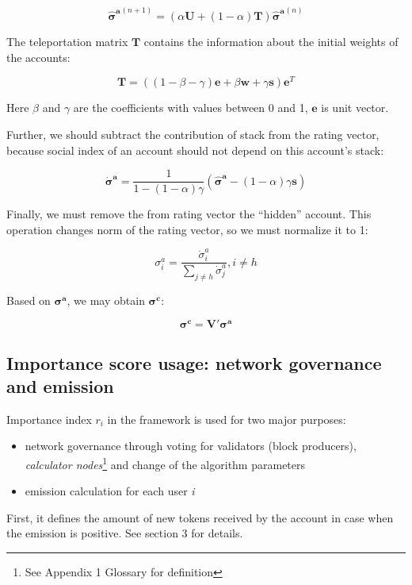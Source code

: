 \documentclass[a4paper,12pt]{article}
\begin{document}
	$$
	\boldsymbol{\hat{\sigma}^a}^{(n+1)} = (\alpha \boldsymbol{U} + (1 - \alpha) \boldsymbol{T})\boldsymbol{ \hat{\sigma}^a}^{(n)}
	$$
	
	The teleportation matrix $\boldsymbol{T}$ contains the information about the initial weights of the accounts:
	
	$$
	\boldsymbol{T} = ((1 - \beta - \gamma) \boldsymbol{e} + \beta \boldsymbol{w} + \gamma \boldsymbol{s}) \boldsymbol{e}^T
	$$
	
	Here $\beta$ and $\gamma$ are the coefficients with values between 0 and 1, $\boldsymbol{e}$ is unit vector.
	
	Further, we should subtract the contribution of stack from the rating vector, because social index of an account should not depend on this account's stack:
	
	$$
	\boldsymbol{\dot{\sigma}^a} = \frac{1}{1 - (1-\alpha) \gamma}(\boldsymbol{\hat{\sigma}^a} - (1 - \alpha) \gamma \boldsymbol{s})
	$$
	
	Finally, we must remove the from rating vector the ``hidden'' account. This operation changes norm of the rating vector, so we must normalize it to 1:
	
	$$
	\sigma^a_i = \frac{\dot{\sigma}^a_i}{\sum_{j \ne h} \dot{\sigma}^a_j}, i \ne h
	$$
	
	
	Based on $\boldsymbol{\sigma^a}$, we may obtain $\boldsymbol{\sigma^c}$:
	
	$$
	\boldsymbol{\sigma^c} = \boldsymbol{V'}\boldsymbol{\sigma^a}
	$$
	
	
	
\subsection{Importance score usage: network governance and emission}

Importance index $r_i$ in the framework is used for two major purposes:
\begin{itemize}
\item  network governance through voting for validators (block producers), \emph{calculator nodes}\footnote{See Appendix 1 Glossary for definition} and change of the algorithm parameters
\item emission calculation for each user \textit{i}
\end{itemize}


First, it defines the amount of new tokens received by the account in case when the emission is positive.  See section 3 for details.
\end{document}
